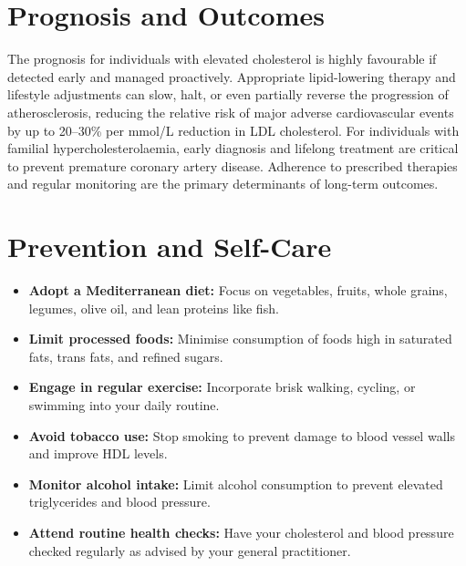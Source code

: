 \section*{Prognosis and Outcomes}
The prognosis for individuals with elevated cholesterol is highly favourable if detected early and managed proactively. Appropriate lipid-lowering therapy and lifestyle adjustments can slow, halt, or even partially reverse the progression of atherosclerosis, reducing the relative risk of major adverse cardiovascular events by up to 20--30\% per mmol/L reduction in LDL cholesterol. For individuals with familial hypercholesterolaemia, early diagnosis and lifelong treatment are critical to prevent premature coronary artery disease. Adherence to prescribed therapies and regular monitoring are the primary determinants of long-term outcomes.

\section*{Prevention and Self-Care}
\begin{itemize}
    \item \textbf{Adopt a Mediterranean diet:} Focus on vegetables, fruits, whole grains, legumes, olive oil, and lean proteins like fish.
    \item \textbf{Limit processed foods:} Minimise consumption of foods high in saturated fats, trans fats, and refined sugars.
    \item \textbf{Engage in regular exercise:} Incorporate brisk walking, cycling, or swimming into your daily routine.
    \item \textbf{Avoid tobacco use:} Stop smoking to prevent damage to blood vessel walls and improve HDL levels.
    \item \textbf{Monitor alcohol intake:} Limit alcohol consumption to prevent elevated triglycerides and blood pressure.
    \item \textbf{Attend routine health checks:} Have your cholesterol and blood pressure checked regularly as advised by your general practitioner.
\end{itemize}

